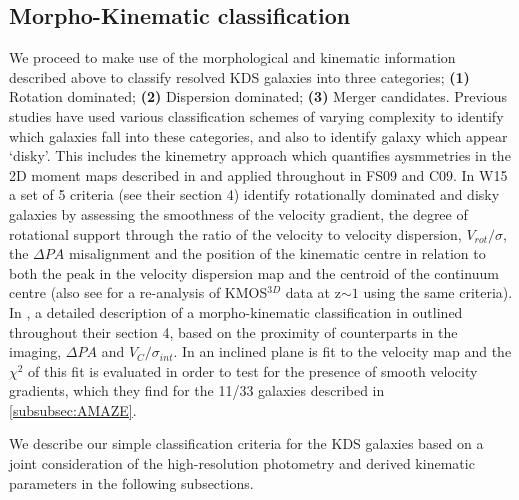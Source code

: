 \documentclass[fleqn,usenatbib]{mn2e}
\begin{document}
\subsection{Morpho-Kinematic classification}\label{subsec:morpho-kin-class}
We proceed to make use of the morphological and kinematic information described above to classify resolved KDS galaxies into three categories; \textbf{(1)} Rotation dominated; \textbf{(2)} Dispersion dominated; \textbf{(3)} Merger candidates.
Previous studies have used various classification schemes of varying complexity to identify which galaxies fall into these categories, and also to identify galaxy which appear `disky'.
This includes the kinemetry approach which quantifies aysmmetries in the 2D moment maps described in \cite{Shapiro2008} and applied throughout in FS09 and C09.
In W15 a set of 5 criteria (see their section 4) identify rotationally dominated and disky galaxies by assessing the smoothness of the velocity gradient, the degree of rotational support through the ratio of the velocity to velocity dispersion, $V_{rot}/\sigma$, the $\Delta PA$ misalignment and the position of the kinematic centre in relation to both the peak in the velocity dispersion map and the centroid of the continuum centre (also see \cite{Rodrigues2016} for a re-analysis of KMOS$^{3D}$ data at z$\sim 1$ using the same criteria).   
In \cite{Epinat2012}, a detailed description of a morpho-kinematic classification in outlined throughout their section 4, based on the proximity of counterparts in the imaging, $\Delta PA$ and $V_{C}/\sigma_{int}$.
In \cite{Gnerucci2011} an inclined plane is fit to the velocity map and the $\chi^{2}$ of this fit is evaluated in order to test for the presence of smooth velocity gradients, which they find for the 11/33 galaxies described in \cref{subsubsec:AMAZE}. 

We describe our simple classification criteria for the KDS galaxies based on a joint consideration of the high-resolution photometry and derived kinematic parameters in the following subsections.
\end{document}

